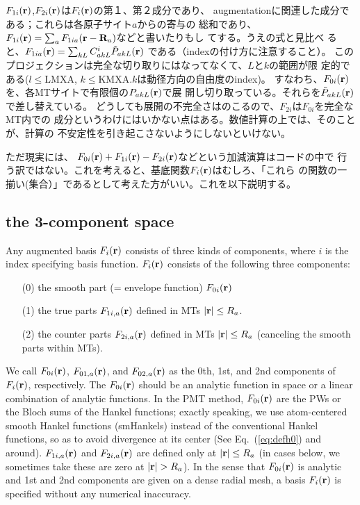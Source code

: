 \documentclass[twocolumn,showpacs,preprintnumbers,amsmath,amssymb,floatfix]{revtex4-1}
\newcommand{\bfr}{{\bf r}}
\newcommand{\bfR}{{\bf R}}
\newcommand{\req}[1]{\mbox{Eq.~\!(\ref{#1})}}
\def\smhs{smHankels}
\begin{document}
$F_{1i}(\bfr)$,$F_{2i}(\bfr)$は$F_i(\bfr)$の第１、第２成分であり、
augmentationに関連した成分である；これらは各原子サイト$a$からの寄与の
総和であり、$F_{1i}(\bfr)=\sum_a F_{1ia}(\bfr-\bfR_a)$などと書いたりもし
てする。うえの式と見比べ
ると、$F_{1ia}(\bfr)=\sum_{kL} C^{i}_{akL} \tilde{P}_{akL}(\bfr)$
である（indexの付け方に注意すること）。
このプロジェクションは完全な切り取りにはなってなくて、$L$と$k$の範囲が限
定的である($l\le$LMXA, $k\le$KMXA.$k$は動径方向の自由度のindex)。
すなわち、$F_{0i}(\bfr)$を、各MTサイトで有限個の${P}_{akL} (\bfr)$で展
開し切り取っている。それらを$\tilde{P}_{akL}(\bfr)$で差し替えている。
どうしても展開の不完全さはのこるので、$F_{2i}$は$F_{0i}$を完全なMT内での
成分というわけにはいかない点はある。数値計算の上では、そのことが、計算の
不安定性を引き起こさないようにしないといけない。

ただ現実には、
$F_{0i}(\bfr)+F_{1i}(\bfr)-F_{2i}(\bfr)$などという加減演算はコードの中で
行う訳ではない。これを考えると、基底関数$F_{i}(\bfr)$はむしろ、「これら
の関数の一揃い(集合）」であるとして考えた方がいい。これを以下説明する。

\subsection{the 3-component space}
\label{sec:3compo}
Any augmented basis $F_{i}(\bfr)$ consists of three kinds of components, 
where $i$ is the index specifying basis function. $F_{i}(\bfr)$
consists of the following three components:
\begin{itemize}
\item[(0)] 
the smooth part (= envelope function) $F_{0i}(\bfr)$
\item[(1)]
the true parts $F_{1i,a}(\bfr)$ defined in MTs $|\bfr| \leq R_a$.
\item[(2)]
the counter parts $F_{2i,a}(\bfr)$ defined in MTs $|\bfr| \leq R_a$ 
(canceling the smooth parts within MTs).
\end{itemize}
We call $F_{0i}(\bfr)$, $F_{01,a}(\bfr)$, and $F_{02,a}(\bfr)$ as the
0th, 1st, and 2nd components of $F_{i}(\bfr)$, respectively.
The $F_{0i}(\bfr)$ should be an analytic function in space or a linear
combination of analytic functions.
In the PMT method, $F_{0i}(\bfr)$ are the PWs or the Bloch sums of the
Hankel functions; exactly speaking, we use atom-centered 
smooth Hankel functions (\smhs) instead of the conventional Hankel functions, 
so as to avoid divergence at its center 
\cite{lmfchap,Bott98} (See \req{eq:defh0} and around). 
$F_{1i,a}(\bfr)$ and $F_{2i,a}(\bfr)$ are defined only at
$|\bfr| \leq R_a$ (in cases below, we sometimes take these are zero at $|\bfr|>R_a$).
In the sense that $F_{0i}(\bfr)$ is analytic and 1st and 2nd components 
are given on a dense radial mesh, a basis $F_{i}(\bfr)$ is specified
without any numerical inaccuracy.
\end{document}

